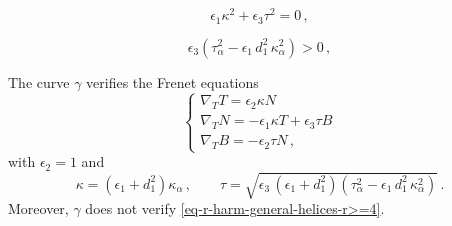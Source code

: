 \documentclass[10pt,a4paper]{amsart}
\begin{document}
\begin{equation}\label{eq-r-harm-general-helices-r>=4}
\epsilon_1 \kappa^2+\epsilon_3 \tau^2=0\,,
\end{equation}

\begin{equation}\label{eq-d-condizione}
\epsilon_3 \left (\tau_\alpha^2-\epsilon_1 \,d_1^2\,\kappa_\alpha^2 \right )>0\,,
\end{equation}

\begin{lemma}\label{lemma-gamma-elica} The curve $\gamma$ verifies the Frenet equations
\begin{equation}\label{Fren-eq-pseudo-bis}
\begin{cases}
\nabla_T T=\epsilon_2 \kappa N \\
\nabla_T N=-\epsilon_1 \kappa T+\epsilon_3 \tau B\\
\nabla_T B=-\epsilon_2 \tau N\,,
\end{cases}
\end{equation}
with $\epsilon_2=1$ and
\begin{equation}\label{eq-kappaetauproduct}
\kappa=(\epsilon_1+d_1^2)\kappa_\alpha\,, \quad \quad \tau=\sqrt{\epsilon_3\,(\epsilon_1+d_1^2) \left (\tau_\alpha^2-\epsilon_1 \,d_1^2\,\kappa_\alpha^2 \right )}\,.
\end{equation}
Moreover, $\gamma$ does not verify \eqref{eq-r-harm-general-helices-r>=4}.
\end{lemma}
\end{document}
